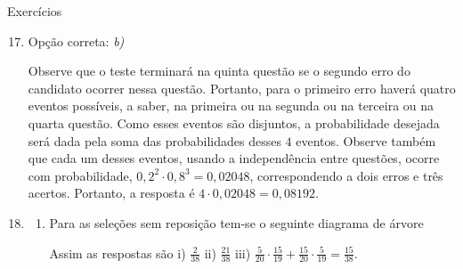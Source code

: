 \begin{answer}{Exercícios}
{\exerciselist
\begin{enumerate}\setcounter{enumi}{16}
\item Opção correta: \textit{b)}

Observe que o teste terminará na quinta questão se o segundo erro do candidato ocorrer nessa questão. Portanto, para o primeiro erro haverá quatro eventos possíveis, a saber, na primeira ou na segunda ou na terceira ou na quarta questão. Como esses eventos são disjuntos, a probabilidade desejada será dada pela soma das probabilidades desses $4$ eventos. Observe também que cada um desses eventos, usando a independência entre questões, ocorre com probabilidade, $0{,}2^2\cdot0{,}8^3=0{,}02048$, correspondendo a dois erros e três acertos. Portanto, a resposta é $4\cdot0{,}02048=0,08192$.


\item 
\begin{enumerate}
\item Para as seleções sem reposição tem-se o seguinte diagrama de árvore

\begin{figure}[H]
\centering

\resizebox{.5\linewidth}{!}
{
}
\end{figure}
  Assim as respostas são i) $ \frac{2}{38}$ ii) $\frac{21}{38}$ iii) $\frac{5}{20}\cdot\frac{15}{19}+\frac{15}{20}\cdot\frac{5}{19}=\frac{15}{38}$.






\end{enumerate}
\end{enumerate}}
\end{answer}
